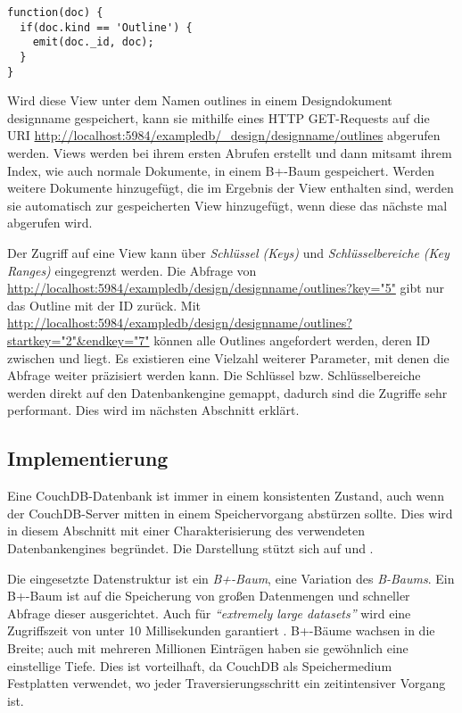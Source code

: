 \lstset{language=javascript}
\medskip
\begin{lstlisting}[caption=View: Map-Funktion zum Ausgeben aller Outlines, label={lst:viewoutlines}]
function(doc) {
  if(doc.kind == 'Outline') {
    emit(doc._id, doc);
  }
}
\end{lstlisting}


Wird diese View unter dem Namen {\selectfont outlines} in einem Designdokument {\selectfont designname} gespeichert, kann sie mithilfe eines HTTP GET-Requests auf die URI {\url{http://localhost:5984/exampledb/_design/designname/outlines}} abgerufen werden. Views werden bei ihrem ersten Abrufen erstellt und dann mitsamt ihrem Index, wie auch normale Dokumente, in einem B+-Baum gespeichert. Werden weitere Dokumente hinzugefügt, die im Ergebnis der View enthalten sind, werden sie automatisch zur gespeicherten View hinzugefügt, wenn diese das nächste mal abgerufen wird. 

Der Zugriff auf eine View kann über \textit{Schlüssel (Keys)} und \textit{Schlüsselbereiche (Key Ranges)} eingegrenzt werden. Die Abfrage von {\url{http://localhost:5984/exampledb/design/designname/outlines?key="5"}} gibt nur das Outline mit der ID {} zurück. Mit {\url{http://localhost:5984/exampledb/design/designname/outlines?startkey="2"&endkey="7"}} können alle Outlines angefordert werden, deren ID zwischen {} und {} liegt. Es existieren eine Vielzahl weiterer Parameter, mit denen die Abfrage weiter präzisiert werden kann. Die Schlüssel bzw. Schlüsselbereiche werden direkt auf den Datenbankengine gemappt, dadurch sind die Zugriffe sehr performant. Dies wird im nächsten Abschnitt erklärt.



\subsection{Implementierung}
\label{subsec:implementierung}

Eine CouchDB-Datenbank ist immer in einem konsistenten Zustand, auch wenn der CouchDB-Server mitten in einem Speichervorgang abstürzen sollte. Dies wird in diesem Abschnitt mit einer Charakterisierung des verwendeten Datenbankengines begründet. Die Darstellung stützt sich auf \cite{btree:couchdb-implementation} und .

Die eingesetzte Datenstruktur ist ein \textit{B+-Baum}, eine Variation des \textit{B-Baums}. Ein B+-Baum ist auf die Speicherung von großen Datenmengen und schneller Abfrage dieser ausgerichtet. Auch für \textit{\enquote{extremely large datasets}} wird eine Zugriffszeit von unter 10 Millisekunden garantiert  . B+-Bäume wachsen in die Breite; auch mit mehreren Millionen Einträgen haben sie gewöhnlich eine einstellige Tiefe. Dies ist vorteilhaft, da CouchDB als Speichermedium Festplatten verwendet, wo jeder Traversierungsschritt ein zeitintensiver Vorgang ist.

